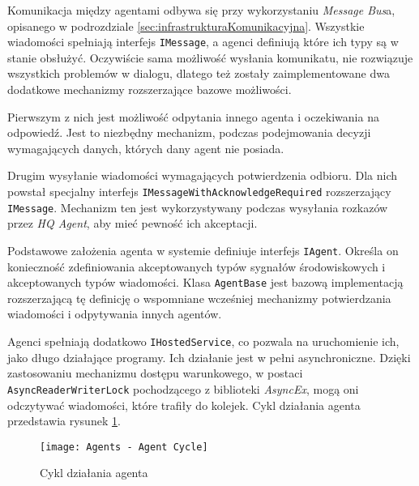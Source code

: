 \par Komunikacja między agentami odbywa się przy wykorzystaniu \emph{Message Bus}a, opisanego w podrozdziale \ref{sec:infrastrukturaKomunikacyjna}. Wszystkie wiadomości spełniają interfejs \texttt{IMessage}, a agenci definiują które ich typy są w stanie obsłużyć. Oczywiście sama możliwość wysłania komunikatu, nie rozwiązuje wszystkich problemów w dialogu, dlatego też zostały zaimplementowane dwa dodatkowe mechanizmy rozszerzające bazowe możliwości.

\par Pierwszym z nich jest możliwość odpytania innego agenta i oczekiwania na odpowiedź. Jest to niezbędny mechanizm, podczas podejmowania decyzji wymagających danych, których dany agent nie posiada.

\par Drugim wysyłanie wiadomości wymagających potwierdzenia odbioru. Dla nich powstał specjalny interfejs \texttt{IMessageWithAcknowledgeRequired} rozszerzający \texttt{IMessage}. Mechanizm ten jest wykorzystywany podczas wysyłania rozkazów przez \emph{HQ Agent}, aby mieć pewność ich akceptacji.

\par Podstawowe założenia agenta w systemie definiuje interfejs \texttt{IAgent}. Określa on konieczność zdefiniowania akceptowanych typów sygnałów środowiskowych i akceptowanych typów wiadomości. Klasa \texttt{AgentBase} jest bazową implementacją rozszerzającą tę definicję o wspomniane wcześniej mechanizmy potwierdzania wiadomości i odpytywania innych agentów.

\par Agenci spełniają dodatkowo \texttt{IHostedService}, co pozwala na uruchomienie ich, jako długo działające programy\cite{BACKGROUND_TASKS_WITH_HOSTED_SERVICES}. Ich działanie jest w pełni asynchroniczne. Dzięki zastosowaniu mechanizmu dostępu warunkowego, w postaci \texttt{AsyncReaderWriterLock} pochodzącego z biblioteki \emph{AsyncEx}\cite{STEPHEN_CLEARY_ASYNCEX_GITHUB}, mogą oni odczytywać wiadomości, które trafiły do kolejek. Cykl działania agenta przedstawia rysunek \ref{fig:agentsAgentCycle}.

\begin{figure}
    \centering
    \texttt{[image: Agents - Agent Cycle]}
    \caption{Cykl działania agenta}
    \label{fig:agentsAgentCycle}
\end{figure}

